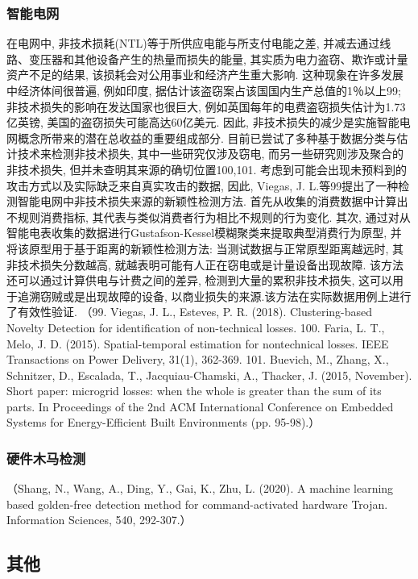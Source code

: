 \documentclass{Style/aas}
\begin{document}
\begin{multicols}{2}
  \subsubsection{智能电网}
  在电网中, 非技术损耗(NTL)等于所供应电能与所支付电能之差, 并减去通过线路、变压器和其他设备产生的热量而损失的能量, 其实质为电力盗窃、欺诈或计量资产不足的结果, 该损耗会对公用事业和经济产生重大影响. 这种现象在许多发展中经济体间很普遍, 例如印度, 据估计该盗窃案占该国国内生产总值的1％以上99; 非技术损失的影响在发达国家也很巨大, 例如英国每年的电费盗窃损失估计为1.73亿英镑, 美国的盗窃损失可能高达60亿美元. 因此, 非技术损失的减少是实施智能电网概念所带来的潜在总收益的重要组成部分.
  目前已尝试了多种基于数据分类与估计技术来检测非技术损失, 其中一些研究仅涉及窃电, 而另一些研究则涉及聚合的非技术损失, 但并未查明其来源的确切位置100,101. 考虑到可能会出现未预料到的攻击方式以及实际缺乏来自真实攻击的数据, 因此, Viegas, J. L.等99提出了一种检测智能电网中非技术损失来源的新颖性检测方法. 首先从收集的消费数据中计算出不规则消费指标, 其代表与类似消费者行为相比不规则的行为变化. 其次, 通过对从智能电表收集的数据进行Gustafson-Kessel模糊聚类来提取典型消费行为原型, 并将该原型用于基于距离的新颖性检测方法: 当测试数据与正常原型距离越远时, 其非技术损失分数越高, 就越表明可能有人正在窃电或是计量设备出现故障. 该方法还可以通过计算供电与计费之间的差异, 检测到大量的累积非技术损失, 这可以用于追溯窃贼或是出现故障的设备, 以商业损失的来源.该方法在实际数据用例上进行了有效性验证.
  （99.	Viegas, J. L., Esteves, P. R. (2018). Clustering-based Novelty Detection for identification of non-technical losses.
  100.	Faria, L. T., Melo, J. D. (2015). Spatial-temporal estimation for nontechnical losses. IEEE Transactions on Power Delivery, 31(1), 362-369.
  101.	Buevich, M., Zhang, X., Schnitzer, D., Escalada, T., Jacquiau-Chamski, A., Thacker, J. (2015, November). Short paper: microgrid losses: when the whole is greater than the sum of its parts. In Proceedings of the 2nd ACM International Conference on Embedded Systems for Energy-Efficient Built Environments (pp. 95-98).）


  \subsubsection{硬件木马检测}
  （Shang, N., Wang, A., Ding, Y., Gai, K., Zhu, L. (2020). A machine learning based golden-free detection method for command-activated hardware Trojan. Information Sciences, 540, 292-307.）


  \subsection{其他}

\end{multicols}
\end{document}

